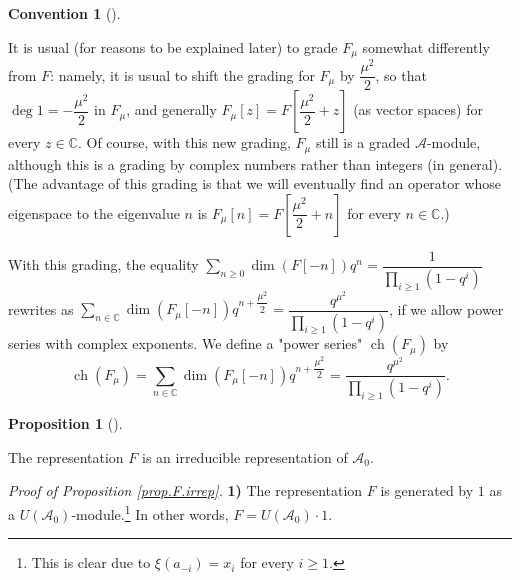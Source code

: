 \documentclass
[numbers=enddot,12pt,final,onecolumn,german,notitlepage]{scrartcl}%
\theoremstyle{definition}
\newtheorem{prop}[theo]{Proposition}
\newenvironment{proposition}[1][]
{\begin{prop}[#1]\begin{leftbar}}
{\end{leftbar}\end{prop}}
\newtheorem{conv}[theo]{Convention}
\newenvironment{Convention}[1][]
{\begin{conv}[#1]\begin{leftbar}}
{\end{leftbar}\end{conv}}
\begin{document}
\begin{Convention}
It is usual (for reasons to be explained later) to grade $F_{\mu}$ somewhat
differently from $F$: namely, it is usual to shift the grading for $F_{\mu}$
by $\dfrac{\mu^{2}}{2}$, so that $\deg1=-\dfrac{\mu^{2}}{2}$ in $F_{\mu}$, and
generally $F_{\mu}\left[  z\right]  =F\left[  \dfrac{\mu^{2}}{2}+z\right]  $
(as vector spaces) for every $z\in\mathbb{C}$. Of course, with this new
grading, $F_{\mu}$ still is a graded $\mathcal{A}$-module, although this is a
grading by complex numbers rather than integers (in general). (The advantage
of this grading is that we will eventually find an operator whose eigenspace
to the eigenvalue $n$ is $F_{\mu}\left[  n\right]  =F\left[  \dfrac{\mu^{2}%
}{2}+n\right]  $ for every $n\in\mathbb{C}$.)

With this grading, the equality $\sum\limits_{n\geq0}\dim\left(  F\left[
-n\right]  \right)  q^{n}=\dfrac{1}{\prod\limits_{i\geq1}\left(
1-q^{i}\right)  }$ rewrites as $\sum\limits_{n\in\mathbb{C}}\dim\left(
F_{\mu}\left[  -n\right]  \right)  q^{n+\dfrac{\mu^{2}}{2}}=\dfrac{q^{\mu^{2}%
}}{\prod\limits_{i\geq1}\left(  1-q^{i}\right)  }$, if we allow power series
with complex exponents. We define a "power series" $\operatorname*{ch}\left(
F_{\mu}\right)  $ by%
\[
\operatorname*{ch}\left(  F_{\mu}\right)  =\sum\limits_{n\in\mathbb{C}}%
\dim\left(  F_{\mu}\left[  -n\right]  \right)  q^{n+\dfrac{\mu^{2}}{2}}%
=\dfrac{q^{\mu^{2}}}{\prod\limits_{i\geq1}\left(  1-q^{i}\right)  }.
\]

\end{Convention}

\begin{proposition}
\label{prop.F.irrep}The representation $F$ is an irreducible representation of
$\mathcal{A}_{0}$.
\end{proposition}

\textit{Proof of Proposition \ref{prop.F.irrep}.} \textbf{1)} The
representation $F$ is generated by $1$ as a $U\left(  \mathcal{A}_{0}\right)
$-module.\footnote{This is clear due to $\xi\left(  a_{-i}\right)  =x_{i}$ for
every $i\geq1$.} In other words, $F=U\left(  \mathcal{A}_{0}\right)  \cdot1$.
\end{document}
